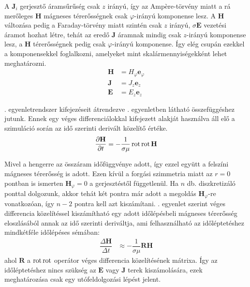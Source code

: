             A $\textbf{J}_i$ gerjesztő áramsűrűség csak $z$ irányú, így az Amp\`ere-törvény miatt a rá merőleges $\textbf{H}$ mágneses térerősségnek csak $\varphi$-irányú komponense lesz. A $\textbf{H}$ változása pedig a Faraday-törvény miatt szintén csak $z$ irányú, $\sigma\textbf{E}$ vezetési áramot hozhat létre, tehát az eredő $\textbf{J}$ áramnak mindig csak $z$-irányú komponense lesz, a $\textbf{H}$ térerősségnek pedig csak $\varphi$-irányú komponense. Így elég csupán ezekkel a komponensekkel foglalkozni, amelyeket mint skalármennyiségekként lehet meghatározni.
            \begin{equation}\label{equ:komponens}
                \begin{aligned}
                    \textbf{H} &= H_{\varphi}\textbf{e}_\varphi\\
                    \textbf{J} &= J_{z}\textbf{e}_z\\
                    \textbf{E} &= E_{z}\textbf{e}_z
                \end{aligned}
            \end{equation}
            \par
            . egyenletrendszer kifejezéseit átrendezve . egyenletben látható összefüggéshez jutunk. Ennek egy véges differenciálokkal kifejezett alakját használva áll elő a szimuláció során az idő szerinti derivált közelítő értéke.
            \begin{equation}\label{equ:dhdt}
                \begin{aligned}
                    \dfrac{\partial \textbf{H}}{\partial t} &= -\dfrac{1}{\sigma\mu}\rot\rot\textbf{H}\\%
                \end{aligned}
            \end{equation}
            \par
            Mivel a hengerre az összáram időfüggvénye adott, így ezzel együtt a felszíni mágneses térerősség is adott. Ezen kívül a forgási szimmetria miatt az $r=0$ pontban is ismerten $\textbf{H}_{\varphi}=0$ a gerjesztéstől függetlenül. Ha $n$ db. diszkretizáló ponttal dolgozunk, akkor tehát két pontra már adott a megoldás $\textbf{H}_{\varphi}$-re vonatkozóan, így $n-2$ pontra kell azt kiszámítani. . egyenlet szerint véges differencia közelítéssel kiszámítható egy adott időlépésbeli mágneses térerősség eloszlásából annak az idő szerinti deriváltja, ami felhasználható az időléptetéshez mindkétféle időlépéses sémában:
            \begin{equation}\label{equ:DhDt}
                \begin{aligned}
                    \dfrac{\Delta \textbf{H}}{\Delta t} &\approx -\dfrac{1}{\sigma\mu}\mathbf{R}\textbf{H}
                \end{aligned}
            \end{equation}
            ahol $\mathbf{R}$ a $\operatorname{rot}\operatorname{rot}$ operátor véges differencia közelítésének mátrixa.
            Így az időléptetéshez nincs szükség az $\textbf{E}$ vagy $\textbf{J}$ terek kiszámolására, ezek meghatározása csak egy utófeldolgozási lépést jelent.
